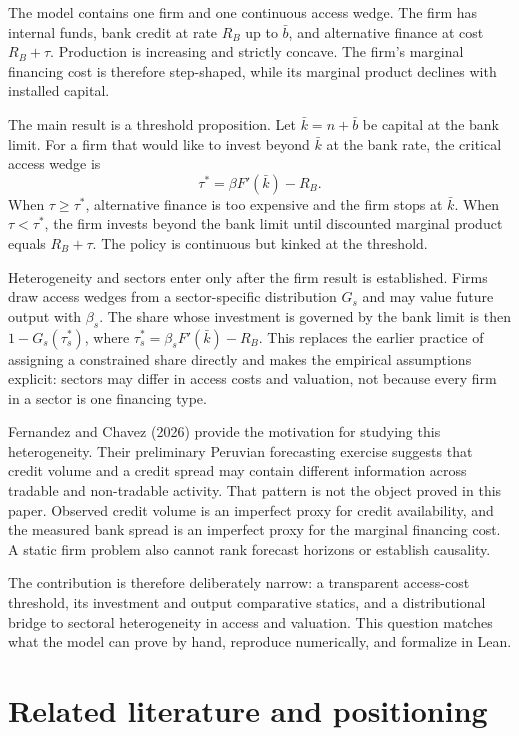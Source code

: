\documentclass[11pt]{article}
\theoremstyle{definition}
\theoremstyle{remark}
\newcommand{\Rb}{R_B}
\begin{document}
The model contains one firm and one continuous access wedge. The firm has
internal funds, bank credit at rate $\Rb$ up to $\bar b$, and alternative
finance at cost $\Rb+\tau$. Production is increasing and strictly concave. The
firm's marginal financing cost is therefore step-shaped, while its marginal
product declines with installed capital.

The main result is a threshold proposition. Let $\bar k=n+\bar b$ be capital at
the bank limit. For a firm that would like to invest beyond $\bar k$ at the bank
rate, the critical access wedge is
\[
\tau^*=\beta F'(\bar k)-\Rb.
\]
When $\tau\ge\tau^*$, alternative finance is too expensive and the firm stops
at $\bar k$. When $\tau<\tau^*$, the firm invests beyond the bank limit until
discounted marginal product equals $\Rb+\tau$. The policy is continuous but
kinked at the threshold.

Heterogeneity and sectors enter only after the firm result is established.
Firms draw access wedges from a sector-specific distribution $G_s$ and may
value future output with $\beta_s$. The share whose investment is governed by
the bank limit is then $1-G_s(\tau_s^*)$, where
$\tau_s^*=\beta_sF'(\bar k)-\Rb$. This replaces the earlier practice of
assigning a constrained share directly and makes the empirical assumptions
explicit: sectors may differ in access costs and valuation, not because every
firm in a sector is one financing type.

Fernandez and Chavez (2026) provide the motivation for studying this
heterogeneity. Their preliminary Peruvian forecasting exercise suggests that
credit volume and a credit spread may contain different information across
tradable and non-tradable activity. That pattern is not the object proved in
this paper. Observed credit volume is an imperfect proxy for credit
availability, and the measured bank spread is an imperfect proxy for the
marginal financing cost. A static firm problem also cannot rank forecast
horizons or establish causality.

The contribution is therefore deliberately narrow: a transparent access-cost
threshold, its investment and output comparative statics, and a distributional
bridge to sectoral heterogeneity in access and valuation. This question matches what the model can
prove by hand, reproduce numerically, and formalize in Lean.

\section{Related literature and positioning}
\end{document}
